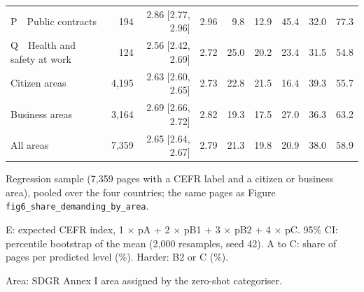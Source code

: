 \begin{table}[htbp]
\begin{threeparttable}
\begin{tabular}{lrrrrrrrr}
\quad P~~Public contracts & 194 & 2.86 [2.77, 2.96] & 2.96 & 9.8 & 12.9 & 45.4 & 32.0 & 77.3 \\
\quad Q~~Health and safety at work & 124 & 2.56 [2.42, 2.69] & 2.72 & 25.0 & 20.2 & 23.4 & 31.5 & 54.8 \\
\hline
Citizen areas & 4,195 & 2.63 [2.60, 2.65] & 2.73 & 22.8 & 21.5 & 16.4 & 39.3 & 55.7 \\
Business areas & 3,164 & 2.69 [2.66, 2.72] & 2.82 & 19.3 & 17.5 & 27.0 & 36.3 & 63.2 \\
All areas & 7,359 & 2.65 [2.64, 2.67] & 2.79 & 21.3 & 19.8 & 20.9 & 38.0 & 58.9 \\
\hline
\end{tabular}
\begin{tablenotes}
\footnotesize
\item Regression sample (7,359 pages with a CEFR label and a citizen or business area), pooled over the four countries; the same pages as Figure \texttt{fig6\_share\_demanding\_by\_area}.
\item E: expected CEFR index, 1 $\times$ pA + 2 $\times$ pB1 + 3 $\times$ pB2 + 4 $\times$ pC. 95\% CI: percentile bootstrap of the mean (2,000 resamples, seed 42). A to C: share of pages per predicted level (\%). Harder: B2 or C (\%).
\item Area: SDGR Annex I area assigned by the zero-shot categoriser.
\end{tablenotes}
\end{threeparttable}
\end{table}
